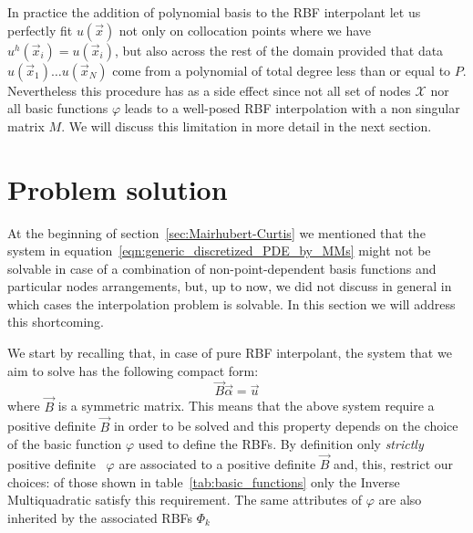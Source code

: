 In practice the addition of polynomial basis to the RBF interpolant let us perfectly fit $u(\vec{x})$ not only on collocation points where we have $u^h(\vec{x}_i)  = u(\vec{x}_i)$, but also across the rest of the domain provided that data $u(\vec{x}_1) \dots u(\vec{x}_N)$ come from a polynomial of total degree less than or equal to $P$.  Nevertheless this procedure has as a side effect since not all set of nodes $\mathcal{X}$ nor all basic functions $\varphi$ leads to a well-posed RBF interpolation with a non singular matrix $M$. We will discuss this limitation in more detail in the next section.



\section{Problem solution}

At the beginning of section~\ref{sec:Mairhubert-Curtis} we mentioned that the system in equation~\eqref{eqn:generic_discretized_PDE_by_MMs} might not be solvable in case of a combination of non-point-dependent basis functions and particular nodes arrangements, but, up to now, we did not discuss in general in which cases the interpolation problem is solvable. In this section we will address this shortcoming.

We start by recalling that, in case of pure RBF interpolant, the system that we aim to solve has the following compact form:
\begin{equation}
	\label{eqn:general_system_from_scattred_data_interpolation_compact_form}
	\vec{B} \vec{\alpha} = \vec{u}
\end{equation}
where $\vec{B}$ is a symmetric matrix.
This means that the above system require a positive definite $\vec{B}$ in order to be solved and this property depends on the choice of the basic function $\varphi$ used to define the RBFs. By definition only \emph{strictly} positive definite~\cite{Fasshauer:details_on_basic_functions} $\varphi$ are associated to a positive definite $\vec{B}$ and, this, restrict our choices: of those shown in table~\vref{tab:basic_functions} only the Inverse Multiquadratic satisfy this requirement. The same attributes of $\varphi$ are also inherited by the associated RBFs $\Phi_k$

